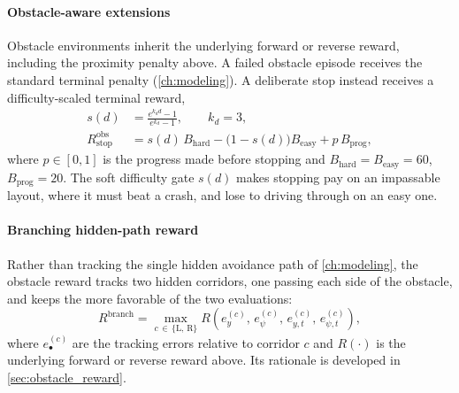 \paragraph{Obstacle-aware extensions}
Obstacle environments inherit the underlying forward or reverse reward, including the
proximity penalty above. A failed obstacle episode receives the standard terminal penalty
(\cref{ch:modeling}). A deliberate stop instead receives a difficulty-scaled terminal reward,
\begin{align}
s(d) &= \frac{e^{k_d d}-1}{e^{k_d}-1}, \qquad k_d = 3, \\
R_{\mathrm{stop}}^{\mathrm{obs}} &= s(d)\,B_{\mathrm{hard}} - \bigl(1-s(d)\bigr)B_{\mathrm{easy}} + p\,B_{\mathrm{prog}},
\end{align}
where $p \in [0,1]$ is the progress made before stopping and $B_{\mathrm{hard}} = B_{\mathrm{easy}} = 60$,
$B_{\mathrm{prog}} = 20$. The soft difficulty gate $s(d)$ makes stopping pay on an impassable
layout, where it must beat a crash, and lose to driving through on an easy one.

\paragraph{Branching hidden-path reward}
Rather than tracking the single hidden avoidance path of \cref{ch:modeling}, the obstacle
reward tracks two hidden corridors, one passing each side of the obstacle, and keeps the
more favorable of the two evaluations:
\begin{equation}
R^{\mathrm{branch}} = \max_{c\,\in\,\{\mathrm{L},\,\mathrm{R}\}}
R\!\left(e_y^{(c)},\, e_\psi^{(c)},\, e_{y,t}^{(c)},\, e_{\psi,t}^{(c)}\right),
\label{eq:branching_reward}
\end{equation}
where $e_\bullet^{(c)}$ are the tracking errors relative to corridor $c$ and $R(\cdot)$ is
the underlying forward or reverse reward above. Its rationale is developed in
\cref{sec:obstacle_reward}.
